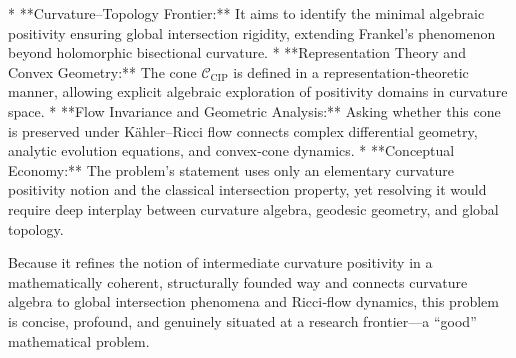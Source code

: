 * **Curvature–Topology Frontier:** It aims to identify the minimal algebraic positivity ensuring global intersection rigidity, extending Frankel’s phenomenon beyond holomorphic bisectional curvature.
* **Representation Theory and Convex Geometry:** The cone \(\mathcal{C}_{\text{CIP}}\) is defined in a representation‑theoretic manner, allowing explicit algebraic exploration of positivity domains in curvature space.
* **Flow Invariance and Geometric Analysis:** Asking whether this cone is preserved under Kähler–Ricci flow connects complex differential geometry, analytic evolution equations, and convex‑cone dynamics.
* **Conceptual Economy:** The problem’s statement uses only an elementary curvature positivity notion and the classical intersection property, yet resolving it would require deep interplay between curvature algebra, geodesic geometry, and global topology.

Because it refines the notion of intermediate curvature positivity in a mathematically coherent, structurally founded way and connects curvature algebra to global intersection phenomena and Ricci‑flow dynamics, this problem is concise, profound, and genuinely situated at a research frontier—a “good” mathematical problem.